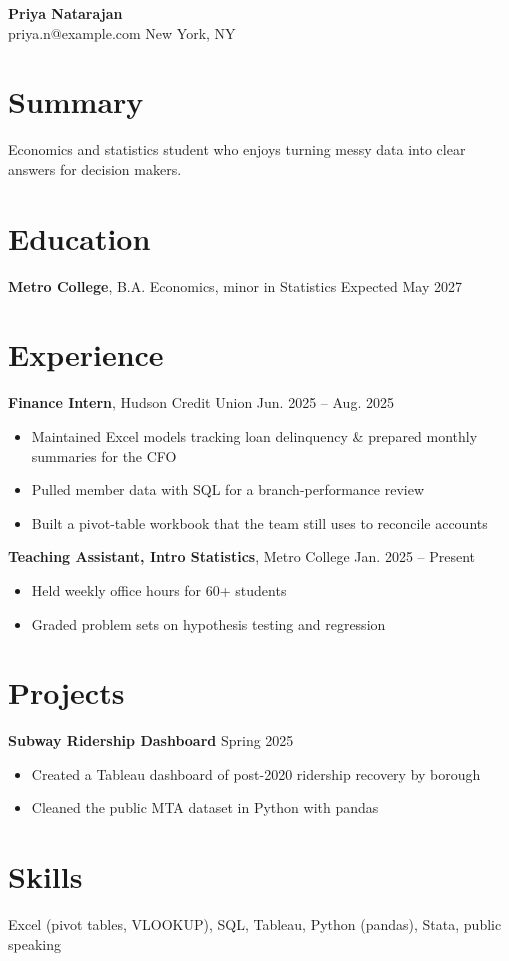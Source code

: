 \documentclass[10pt]{article}
\begin{document}
{\LARGE\textbf{Priya Natarajan}}\\
priya.n@example.com \textbullet{} New York, NY

\section*{Summary}
Economics and statistics student who enjoys turning messy data into clear answers for decision makers.

\section*{Education}
\textbf{Metro College}, B.A. Economics, minor in Statistics \hfill Expected May 2027

\section*{Experience}
\textbf{Finance Intern}, Hudson Credit Union \hfill Jun. 2025 -- Aug. 2025
\begin{itemize}
  \item Maintained Excel models tracking loan delinquency \& prepared monthly summaries for the CFO
  \item Pulled member data with SQL for a branch-performance review
  \item Built a pivot-table workbook that the team still uses to reconcile accounts
\end{itemize}

\textbf{Teaching Assistant, Intro Statistics}, Metro College \hfill Jan. 2025 -- Present
\begin{itemize}
  \item Held weekly office hours for 60+ students
  \item Graded problem sets on hypothesis testing and regression
\end{itemize}

\section*{Projects}
\textbf{Subway Ridership Dashboard} \hfill Spring 2025
\begin{itemize}
  \item Created a Tableau dashboard of post-2020 ridership recovery by borough
  \item Cleaned the public MTA dataset in Python with pandas
\end{itemize}

\section*{Skills}
Excel (pivot tables, VLOOKUP), SQL, Tableau, Python (pandas), Stata, public speaking
\end{document}
